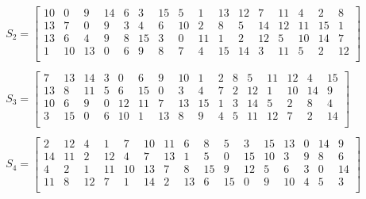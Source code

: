 \documentclass[a4paper, 14pt]{extarticle}
\begin{document}
\begin{enumerate}
\begin{equation}
\begin{array}{c}
        \end{array}
    \end{equation}\\
    \begin{equation}
        \begin{array}{c}
            S_2 = \begin{bmatrix}
                10  & 0   & 9   & 14  & 6   & 3   & 15  & 5   & 1   & 13  & 12  & 7   & 11  & 4   & 2   & 8   \\
                13  & 7   & 0   & 9   & 3   & 4   & 6   & 10  & 2   & 8   & 5   & 14  & 12  & 11  & 15  & 1   \\
                13  & 6   & 4   & 9   & 8   & 15  & 3   & 0   & 11  & 1   & 2   & 12  & 5   & 10  & 14  & 7   \\
                1   & 10  & 13  & 0   & 6   & 9   & 8   & 7   & 4   & 15  & 14  & 3   & 11  & 5   & 2   & 12  \\
            \end{bmatrix}\\
            \\
            S_3 = \begin{bmatrix}
                7   & 13  & 14  & 3   & 0   & 6   & 9   & 10  & 1   & 2   & 8   & 5   & 11  & 12  & 4   & 15  \\
                13  & 8   & 11  & 5   & 6   & 15  & 0   & 3   & 4   & 7   & 2   & 12  & 1   & 10  & 14  & 9   \\
                10  & 6   & 9   & 0   & 12  & 11  & 7   & 13  & 15  & 1   & 3   & 14  & 5   & 2   & 8   & 4   \\
                3   & 15  & 0   & 6   & 10  & 1   & 13  & 8   & 9   & 4   & 5   & 11  & 12  & 7   & 2   & 14  \\
            \end{bmatrix}\\
            \\
            S_4 = \begin{bmatrix}
                2   & 12  & 4   & 1   & 7   & 10  & 11  & 6   & 8   & 5   & 3   & 15  & 13  & 0   & 14  & 9   \\
                14  & 11  & 2   & 12  & 4   & 7   & 13  & 1   & 5   & 0   & 15  & 10  & 3   & 9   & 8   & 6   \\
                4   & 2   & 1   & 11  & 10  & 13  & 7   & 8   & 15  & 9   & 12  & 5   & 6   & 3   & 0   & 14  \\
                11  & 8   & 12  & 7   & 1   & 14  & 2   & 13  & 6   & 15  & 0   & 9   & 10  & 4   & 5   & 3   \\

\end{bmatrix}
\end{array}
\end{equation}
\end{enumerate}
\end{document}

